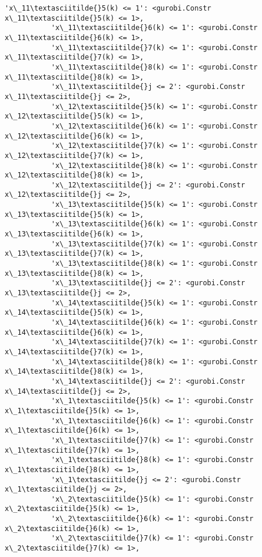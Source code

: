 \documentclass[11pt]{article}
\begin{document}
\begin{Verbatim}[commandchars=\\\{\}]
           'x\_11\textasciitilde{}5(k) <= 1': <gurobi.Constr x\_11\textasciitilde{}5(k) <= 1>,
           'x\_11\textasciitilde{}6(k) <= 1': <gurobi.Constr x\_11\textasciitilde{}6(k) <= 1>,
           'x\_11\textasciitilde{}7(k) <= 1': <gurobi.Constr x\_11\textasciitilde{}7(k) <= 1>,
           'x\_11\textasciitilde{}8(k) <= 1': <gurobi.Constr x\_11\textasciitilde{}8(k) <= 1>,
           'x\_11\textasciitilde{}j <= 2': <gurobi.Constr x\_11\textasciitilde{}j <= 2>,
           'x\_12\textasciitilde{}5(k) <= 1': <gurobi.Constr x\_12\textasciitilde{}5(k) <= 1>,
           'x\_12\textasciitilde{}6(k) <= 1': <gurobi.Constr x\_12\textasciitilde{}6(k) <= 1>,
           'x\_12\textasciitilde{}7(k) <= 1': <gurobi.Constr x\_12\textasciitilde{}7(k) <= 1>,
           'x\_12\textasciitilde{}8(k) <= 1': <gurobi.Constr x\_12\textasciitilde{}8(k) <= 1>,
           'x\_12\textasciitilde{}j <= 2': <gurobi.Constr x\_12\textasciitilde{}j <= 2>,
           'x\_13\textasciitilde{}5(k) <= 1': <gurobi.Constr x\_13\textasciitilde{}5(k) <= 1>,
           'x\_13\textasciitilde{}6(k) <= 1': <gurobi.Constr x\_13\textasciitilde{}6(k) <= 1>,
           'x\_13\textasciitilde{}7(k) <= 1': <gurobi.Constr x\_13\textasciitilde{}7(k) <= 1>,
           'x\_13\textasciitilde{}8(k) <= 1': <gurobi.Constr x\_13\textasciitilde{}8(k) <= 1>,
           'x\_13\textasciitilde{}j <= 2': <gurobi.Constr x\_13\textasciitilde{}j <= 2>,
           'x\_14\textasciitilde{}5(k) <= 1': <gurobi.Constr x\_14\textasciitilde{}5(k) <= 1>,
           'x\_14\textasciitilde{}6(k) <= 1': <gurobi.Constr x\_14\textasciitilde{}6(k) <= 1>,
           'x\_14\textasciitilde{}7(k) <= 1': <gurobi.Constr x\_14\textasciitilde{}7(k) <= 1>,
           'x\_14\textasciitilde{}8(k) <= 1': <gurobi.Constr x\_14\textasciitilde{}8(k) <= 1>,
           'x\_14\textasciitilde{}j <= 2': <gurobi.Constr x\_14\textasciitilde{}j <= 2>,
           'x\_1\textasciitilde{}5(k) <= 1': <gurobi.Constr x\_1\textasciitilde{}5(k) <= 1>,
           'x\_1\textasciitilde{}6(k) <= 1': <gurobi.Constr x\_1\textasciitilde{}6(k) <= 1>,
           'x\_1\textasciitilde{}7(k) <= 1': <gurobi.Constr x\_1\textasciitilde{}7(k) <= 1>,
           'x\_1\textasciitilde{}8(k) <= 1': <gurobi.Constr x\_1\textasciitilde{}8(k) <= 1>,
           'x\_1\textasciitilde{}j <= 2': <gurobi.Constr x\_1\textasciitilde{}j <= 2>,
           'x\_2\textasciitilde{}5(k) <= 1': <gurobi.Constr x\_2\textasciitilde{}5(k) <= 1>,
           'x\_2\textasciitilde{}6(k) <= 1': <gurobi.Constr x\_2\textasciitilde{}6(k) <= 1>,
           'x\_2\textasciitilde{}7(k) <= 1': <gurobi.Constr x\_2\textasciitilde{}7(k) <= 1>,

\end{Verbatim}
\end{document}
